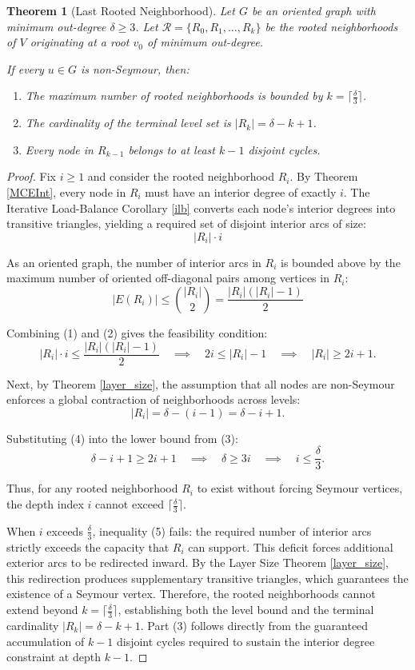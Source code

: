 \documentclass[AMS, Times1COL]{article} %
\newtheorem{theorem}{Theorem}[section]
\theoremstyle{definition}
\begin{document}
	\begin{theorem}[Last Rooted Neighborhood] \label{smfmla}
		Let $G$ be an oriented graph with minimum out-degree $\delta \ge 3$. Let $\mathcal{R} = \{R_0, R_1, \dots, R_k\}$ be the rooted neighborhoods of $V$ originating at a root $v_0$ of minimum out-degree.
		
		If every $u \in G$ is non-Seymour, then:
		\begin{enumerate}
			\item The maximum number of rooted neighborhoods is bounded by $k = \lceil \frac{\delta}{3} \rceil$.
			\item The cardinality of the terminal level set is $|R_k| = \delta - k + 1$.
			\item Every node in $R_{k-1}$ belongs to at least $k-1$ disjoint cycles.
		\end{enumerate}
	\end{theorem}
	\begin{proof}
		Fix $i \ge 1$ and consider the rooted neighborhood $R_i$. By Theorem \ref{MCEInt}, every node in $R_i$ must have an interior degree of exactly $i$. The Iterative Load-Balance Corollary \ref{ilb} converts each node's interior degrees into transitive triangles, yielding a required set of disjoint interior arcs of size:
		\[ |R_i| \cdot i \tag{1} \]
		
		As an oriented graph, the number of interior arcs in $R_i$ is bounded above by the maximum number of oriented off-diagonal pairs among vertices in $R_i$:
		\[ |E(R_i)| \le \binom{|R_i|}{2} = \frac{|R_i|(|R_i| - 1)}{2} \tag{2} \]
		
		Combining (1) and (2) gives the feasibility condition:
		\[ |R_i| \cdot i \le \frac{|R_i|(|R_i| - 1)}{2} \quad \implies \quad 2i \le |R_i| - 1 \quad \implies \quad |R_i| \ge 2i + 1. \tag{3} \]
		
		Next, by Theorem \ref{layer_size}, the assumption that all nodes are non-Seymour enforces a global contraction of neighborhoods across levels:
		\[ |R_i| = \delta - (i - 1) = \delta - i + 1. \tag{4} \]
		
		Substituting (4) into the lower bound from (3):
		\[ \delta - i + 1 \ge 2i + 1 \quad \implies \quad \delta \ge 3i \quad \implies \quad i \le \frac{\delta}{3}. \tag{5} \]
		
		Thus, for any rooted neighborhood $R_i$ to exist without forcing Seymour vertices, the depth index $i$ cannot exceed $\lceil \frac{\delta}{3} \rceil$. 
		
		When $i$ exceeds $\frac{\delta}{3}$, inequality (5) fails: the required number of interior arcs strictly exceeds the capacity that $R_i$ can support. This deficit forces additional exterior arcs to be redirected inward. By the Layer Size Theorem \ref{layer_size}, this redirection produces supplementary transitive triangles, which guarantees the existence of a Seymour vertex. Therefore, the rooted neighborhoods cannot extend beyond $k = \lceil \frac{\delta}{3} \rceil$, establishing both the level bound and the terminal cardinality $|R_k| = \delta - k + 1$. Part (3) follows directly from the guaranteed accumulation of $k-1$ disjoint cycles required to sustain the interior degree constraint at depth $k-1$.
	\end{proof}
	
\end{document}
